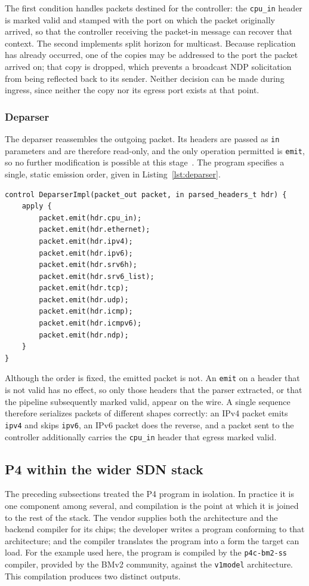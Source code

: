 The first condition handles packets destined for the controller: the \texttt{cpu\_in} header is marked valid and stamped with the port on which the packet originally arrived, so that the controller receiving the packet-in message can recover that context. The second implements split horizon for multicast. Because replication has already occurred, one of the copies may be addressed to the port the packet arrived on; that copy is dropped, which prevents a broadcast NDP solicitation from being reflected back to its sender. Neither decision can be made during ingress, since neither the copy nor its egress port exists at that point.

\subsubsection{Deparser}
The deparser reassembles the outgoing packet. Its headers are passed as \texttt{in} parameters and are therefore read-only, and the only operation permitted is \texttt{emit}, so no further modification is possible at this stage~\cite{p4spec}. The program specifies a single, static emission order, given in Listing~\ref{lst:deparser}.

\begin{lstlisting}[caption={The deparser in \texttt{main.p4}.},label={lst:deparser}]
control DeparserImpl(packet_out packet, in parsed_headers_t hdr) {
    apply {
        packet.emit(hdr.cpu_in);
        packet.emit(hdr.ethernet);
        packet.emit(hdr.ipv4);
        packet.emit(hdr.ipv6);
        packet.emit(hdr.srv6h);
        packet.emit(hdr.srv6_list);
        packet.emit(hdr.tcp);
        packet.emit(hdr.udp);
        packet.emit(hdr.icmp);
        packet.emit(hdr.icmpv6);
        packet.emit(hdr.ndp);
    }
}
\end{lstlisting}

Although the order is fixed, the emitted packet is not. An \texttt{emit} on a header that is not valid has no effect, so only those headers that the parser extracted, or that the pipeline subsequently marked valid, appear on the wire. A single sequence therefore serializes packets of different shapes correctly: an IPv4 packet emits \texttt{ipv4} and skips \texttt{ipv6}, an IPv6 packet does the reverse, and a packet sent to the controller additionally carries the \texttt{cpu\_in} header that egress marked valid.

\subsection{P4 within the wider SDN stack}\label{sec:p4-sdn-stack}
The preceding subsections treated the P4 program in isolation. In practice it is one component among several, and compilation is the point at which it is joined to the rest of the stack. The vendor supplies both the architecture and the backend compiler for its chips; the developer writes a program conforming to that architecture; and the compiler translates the program into a form the target can load. For the example used here, the program is compiled by the \texttt{p4c-bm2-ss} compiler, provided by the BMv2 community, against the \texttt{v1model} architecture. This compilation produces two distinct outputs.

